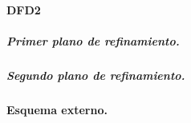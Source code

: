 \documentclass[12pt,a4paper]{article}
\begin{document}
\paragraph{DFD2}
\subparagraph{Primer plano de refinamiento.}
\begin{center}
\end{center}
\newpage
\subparagraph{Segundo plano de refinamiento.}
\begin{center}
\end{center}
\paragraph{Esquema externo.}
\begin{center}
\end{center} 
\end{document}
